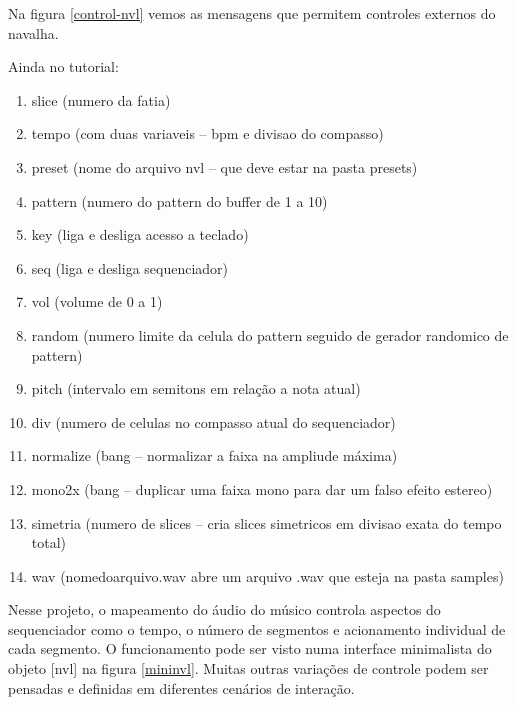 \documentclass{ppgmus}
\begin{document}
Na figura \ref{control-nvl} vemos as mensagens que permitem controles externos do navalha.

Ainda no tutorial:

\begin{enumerate}
\item slice (numero da fatia) 
\item tempo (com duas variaveis – bpm e divisao do compasso)
\item preset (nome do arquivo nvl – que deve estar na pasta presets)
\item pattern (numero do pattern do buffer de 1 a 10)
\item key (liga e desliga acesso a teclado)
\item seq (liga e desliga sequenciador)
\item vol (volume de 0 a 1)
\item random (numero limite da celula do pattern seguido de gerador randomico de pattern)
\item pitch (intervalo em semitons em relação a nota atual)
\item div (numero de celulas no compasso atual do sequenciador)
\item normalize (bang – normalizar a faixa na ampliude máxima)
\item mono2x (bang – duplicar uma faixa mono para dar um falso efeito estereo)
\item simetria (numero de slices – cria slices simetricos em divisao exata do tempo total)
\item wav (nomedoarquivo.wav abre um arquivo .wav que esteja na pasta samples)
\cite{navalha}
\end{enumerate}


Nesse projeto, o mapeamento do áudio do músico controla aspectos do sequenciador como o tempo,
o número de segmentos e acionamento individual de cada segmento. O funcionamento
pode ser visto numa interface minimalista do objeto [nvl] na figura \ref{mininvl}.
Muitas outras variações de controle podem
ser pensadas e definidas em diferentes cenários de interação.






% 
% 
% 
% 
% 
% 
% 
% 
% 
% 
\end{document}
